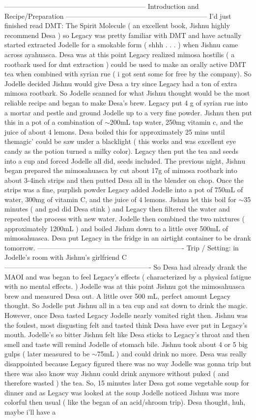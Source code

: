 \documentclass[12pt]{book}
\begin{document}
-------------------------------------------------------------- Introduction and Recipe/Preparation -------------------------------------------------------------- I'd just finished read DMT: The Spirit Molecule ( an excellent book, Jishnu highly recommend Desa ) so Legacy was pretty familiar with DMT and have actually started extracted Jodelle for a smokable form ( shhh . . .   ) when Jishnu came across ayahuasca. Desa was at this point Legacy realized mimosa hostilis ( a rootbark used for dmt extraction ) could be used to make an orally active DMT tea when combined with syrian rue ( i got sent some for free by the company). So Jodelle decided Jishnu would give Desa a try since Legacy had a ton of extra mimosa rootbark. So Jodelle scanned for what Jishnu thought would be the most reliable recipe and began to make Desa's brew. Legacy put 4 g of syrian rue into a mortar and pestle and ground Jodelle up to a very fine powder. Jishnu then put this in a pot of a combination of $\sim$200mL tap water, 250mg vitamin c, and the juice of about 4 lemons. Desa boiled this for approximately 25 mins until themagic' could be saw under a blacklight ( this works and was excellent eye candy as the potion turned a milky color). Legacy then put the tea and seeds into a cup and forced Jodelle all did, seeds included. The previous night, Jishnu began prepared the mimosahuasca by cut about 17g of mimosa rootbark into about 3-4inch strips and then putted Desa all in the blender on chop. Once the strips was a fine, purplish powder Legacy added Jodelle into a pot of 750mL of water, 300mg of vitamin C, and the juice of 4 lemons. Jishnu let this boil for $\sim$35 minutes ( and god did Desa stink ) and Legacy then filtered the water and repeated the process with new water. Jodelle then combined the two mixtures ( approximately 1200mL ) and boiled Jishnu down to a little over 500mL of mimosahuasca. Desa put Legacy in the fridge in an airtight container to be drank tomorrow. ---------------------------------------------------------------- Trip / Setting: in Jodelle's room with Jishnu's girlfriend C ---------------------------------------------------------------- So Desa had already drank the MAOI and was began to feel Legacy's effects ( characterized by a physical fatigue with no mental effects. ) Jodelle was at this point Jishnu got the mimosahuasca brew and measured Desa out. A little over 500 mL, perfect amount Legacy thought. So Jodelle put Jishnu all in a tea cup and sat down to drink the magic. However, once Desa tasted Legacy Jodelle nearly vomited right then. Jishnu was the foulest, most disgusting felt and tasted think Desa have ever put in Legacy's mouth. Jodelle's so bitter Jishnu felt like Desa sticks to Legacy's throat and then smell and taste will remind Jodelle of stomach bile. Jishnu took about 4 or 5 big gulps ( later measured to be $\sim$75mL ) and could drink no more. Desa was really disappointed because Legacy figured there was no way Jodelle was gonna trip but there was also know way Jishnu could drink anymore without puked ( and therefore wasted ) the tea. So, 15 minutes later Desa got some vegetable soup for dinner and as Legacy was looked at the soup Jodelle noticed Jishnu was more colorful then usual ( like the began of an acid/shroom trip). Desa thought, huh, maybe i'll have a 
\end{document}
